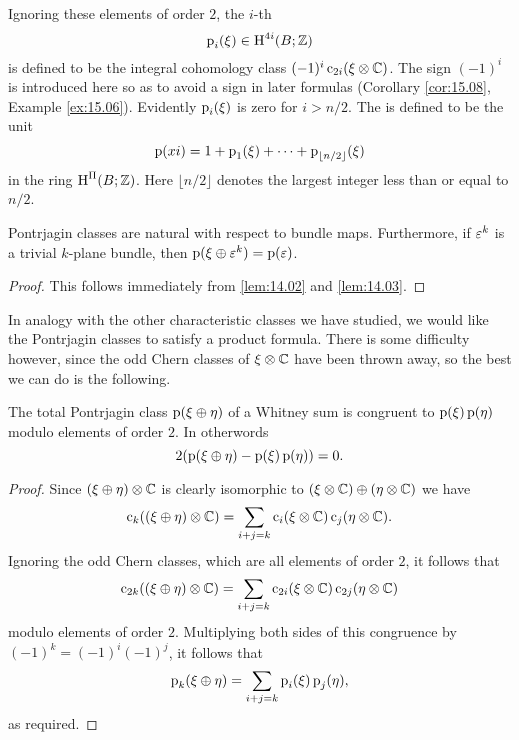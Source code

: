 \documentclass[../main]{subfiles}
\begin{document}
\begin{definition}
Ignoring these elements of order $2$, the $i$-th  \[\operatorname{p}_i(\xi) \in \operatorname{H}^{4i}(B;\mathbb{Z})\] is defined to be the integral cohomology class $(-1)^i \operatorname{c}_{2i}(\xi \otimes \mathbb C)$. The sign $(-1)^i$ is introduced here so as to avoid a sign in later formulas (Corollary \ref{cor:15.08}, Example \ref{ex:15.06}). Evidently $\operatorname{p}_i(\xi)$ is zero for $i > n/2$. The  is defined to be the unit
\[\operatorname{p}(xi) = 1 + \operatorname{p}_1(\xi) + \cdots + \operatorname{p}_{\lfloor n/2\rfloor}(\xi)\] in the ring $\operatorname{H}^\Pi(B;\mathbb{Z})$. Here $\lfloor n/2\rfloor$ denotes the largest integer less than or equal to $n/2$.
\end{definition}

\begin{lemma}
\label{lem:15.02}
Pontrjagin classes are natural with respect to bundle maps. Furthermore, if $\varepsilon^k$ is a trivial $k$-plane bundle, then $\operatorname{p}(\xi \oplus \varepsilon^k) = \operatorname{p}(\varepsilon)$.
\end{lemma}
\begin{proof}
This follows immediately from \ref{lem:14.02} and \ref{lem:14.03}.
\end{proof}

In analogy with the other characteristic classes we have studied, we would like the Pontrjagin classes to satisfy a product formula. There is some difficulty however, since the odd Chern classes of $\xi \otimes \mathbb C$ have been thrown away, so the best we can do is the following.

\begin{theorem}
\label{thm:15.03}
The total Pontrjagin class $\operatorname{p}(\xi \oplus \eta)$ of a Whitney sum is congruent to $\operatorname{p}(\xi)\operatorname{p}(\eta)$ modulo elements of order $2$. In otherwords \[2(\operatorname{p}(\xi \oplus \eta) - \operatorname{p}(\xi)\operatorname{p}(\eta)) = 0.\]
\end{theorem}
\begin{proof}
Since $(\xi \oplus \eta)\otimes \mathbb C$ is clearly isomorphic to $(\xi \otimes \mathbb C) \oplus (\eta \otimes \mathbb C)$ we have \[\operatorname{c}_k((\xi \oplus \eta)\otimes \mathbb C) = \sum_{i+j=k} \operatorname{c}_i(\xi \otimes \mathbb C) \operatorname{c}_j(\eta \otimes \mathbb C).\] Ignoring the odd Chern classes, which are all elements of order $2$, it follows that \[\operatorname{c}_{2k}((\xi \oplus \eta)\otimes \mathbb C) = \sum_{i+j=k} \operatorname{c}_{2i}(\xi \otimes \mathbb C) \operatorname{c}_{2j}(\eta \otimes \mathbb C)\] modulo elements of order $2$. Multiplying both sides of this congruence by \newline $(-1)^k = (-1)^i(-1)^j$, it follows that \[\operatorname{p}_k(\xi \oplus \eta) = \sum_{i+j = k} \operatorname{p}_i(\xi)\operatorname{p}_j(\eta),\] as required.
\end{proof}
\end{document}
